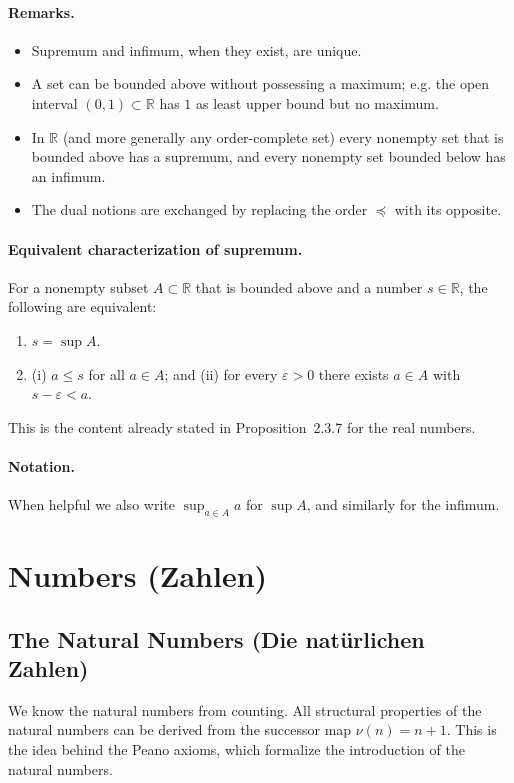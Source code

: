 \documentclass[12pt,a4paper]{article}
\newcommand{\R}{\mathbb{R}}
\newcommand{\eps}{\varepsilon}
\theoremstyle{plain}
\theoremstyle{definition}
\theoremstyle{remark}
\begin{document}
\paragraph{Remarks.}
\begin{itemize}[leftmargin=*]
	\item Supremum and infimum, when they exist, are unique.
	\item A set can be bounded above without possessing a maximum; e.g. the open interval \((0,1)\subset \R\) has \(1\) as least upper bound but no maximum.
	\item In \(\R\) (and more generally any order-complete set) every nonempty set that is bounded above has a supremum, and every nonempty set bounded below has an infimum.
	\item The dual notions are exchanged by replacing the order \(\preceq\) with its opposite.
\end{itemize}

\paragraph{Equivalent characterization of supremum.} For a nonempty subset \(A\subset \R\) that is bounded above and a number \(s\in\R\), the following are equivalent:
\begin{enumerate}[label=\alph*) ,leftmargin=*]
	\item \(s=\sup A\).
	\item (i) \(a\le s\) for all \(a\in A\); and (ii) for every \(\eps>0\) there exists \(a\in A\) with \(s-\eps < a\).
\end{enumerate}
This is the content already stated in Proposition~2.3.7 for the real numbers.

\paragraph{Notation.} When helpful we also write \(\sup_{a\in A} a\) for \(\sup A\), and similarly for the infimum.

\section{Numbers (Zahlen)}

\subsection{The Natural Numbers (Die natürlichen Zahlen)}
We know the natural numbers from counting. All structural properties of the natural numbers can be derived from the 
successor map $\nu(n)=n+1$. This is the idea behind the Peano axioms, which formalize the introduction of the natural numbers.
\end{document}

